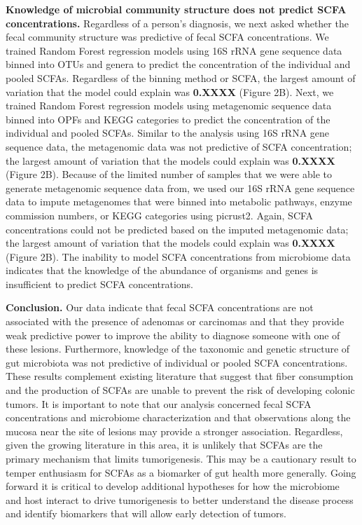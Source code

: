 \documentclass[11pt,]{article}
\begin{document}
\textbf{Knowledge of microbial community structure does not predict SCFA
concentrations.} Regardless of a person's diagnosis, we next asked
whether the fecal community structure was predictive of fecal SCFA
concentrations. We trained Random Forest regression models using 16S
rRNA gene sequence data binned into OTUs and genera to predict the
concentration of the individual and pooled SCFAs. Regardless of the
binning method or SCFA, the largest amount of variation that the model
could explain was \textbf{0.XXXX} (Figure 2B). Next, we trained Random
Forest regression models using metagenomic sequence data binned into
OPFs and KEGG categories to predict the concentration of the individual
and pooled SCFAs. Similar to the analysis using 16S rRNA gene sequence
data, the metagenomic data was not predictive of SCFA concentration; the
largest amount of variation that the models could explain was
\textbf{0.XXXX} (Figure 2B). Because of the limited number of samples
that we were able to generate metagenomic sequence data from, we used
our 16S rRNA gene sequence data to impute metagenomes that were binned
into metabolic pathways, enzyme commission numbers, or KEGG categories
using picrust2. Again, SCFA concentrations could not be predicted based
on the imputed metagenomic data; the largest amount of variation that
the models could explain was \textbf{0.XXXX} (Figure 2B). The inability
to model SCFA concentrations from microbiome data indicates that the
knowledge of the abundance of organisms and genes is insufficient to
predict SCFA concentrations.

\textbf{Conclusion.} Our data indicate that fecal SCFA concentrations
are not associated with the presence of adenomas or carcinomas and that
they provide weak predictive power to improve the ability to diagnose
someone with one of these lesions. Furthermore, knowledge of the
taxonomic and genetic structure of gut microbiota was not predictive of
individual or pooled SCFA concentrations. These results complement
existing literature that suggest that fiber consumption and the
production of SCFAs are unable to prevent the risk of developing colonic
tumors. It is important to note that our analysis concerned fecal SCFA
concentrations and microbiome characterization and that observations
along the mucosa near the site of lesions may provide a stronger
association. Regardless, given the growing literature in this area, it
is unlikely that SCFAs are the primary mechanism that limits
tumorigenesis. This may be a cautionary result to temper enthusiasm for
SCFAs as a biomarker of gut health more generally. Going forward it is
critical to develop additional hypotheses for how the microbiome and
host interact to drive tumorigenesis to better understand the disease
process and identify biomarkers that will allow early detection of
tumors.
\end{document}
